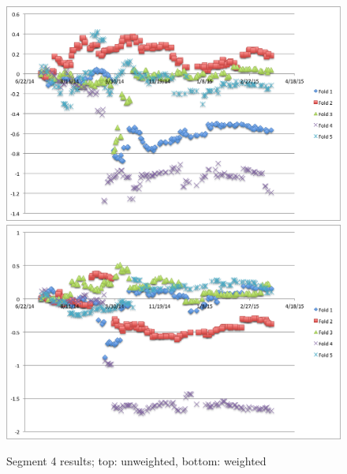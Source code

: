 \documentclass[11pt,letterpaper]{article}
\begin{document}
\begin{figure}
	\centering
	\centering
   	\includegraphics[width=14cm]{images/unweighted-exp-3.png}
    	\qquad
    	\includegraphics[width=14cm]{images/weighted-exp-3.png}
    	\caption{Segment 4 results; top: unweighted, bottom: weighted}%
    	\label{fig:4}
\end{figure}
\end{document}
